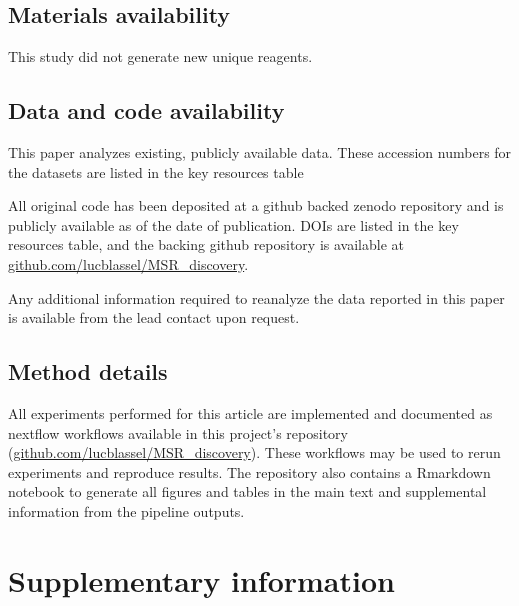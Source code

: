 \documentclass[
  11pt,
  twoside,
  BCOR=10mm,
  listof=totoc]{scrbook}
\begin{document}
\hypertarget{materials-availability}{%
\subsection*{Materials availability}\label{materials-availability}}

This study did not generate new unique reagents.

\hypertarget{data-and-code-availability}{%
\subsection*{Data and code availability}\label{data-and-code-availability}}

This paper analyzes existing, publicly available data. These accession numbers for the datasets are listed in the key resources table

All original code has been deposited at a github backed zenodo repository and is publicly available as of the date of publication. DOIs are listed in the key resources table, and the backing github repository is available at \href{https://github.com/lucblassel/MSR_discovery}{github.com/lucblassel/MSR\_discovery}.

Any additional information required to reanalyze the data reported in this paper is available from the lead contact upon request.

\hypertarget{method-details}{%
\subsection*{Method details}\label{method-details}}

All experiments performed for this article are implemented and documented as nextflow workflows available in this project's repository (\href{https://github.com/lucblassel/MSR_discovery}{github.com/lucblassel/MSR\_discovery}). These workflows may be used to rerun experiments and reproduce results. The repository also contains a Rmarkdown notebook to generate all figures and tables in the main text and supplemental information from the pipeline outputs.

\hypertarget{supplementary-information}{%
\section*{Supplementary information}\label{supplementary-information}}
\end{document}
